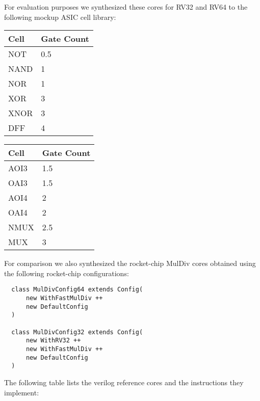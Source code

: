 For evaluation purposes we synthesized these cores for RV32 and RV64 to the following mockup ASIC cell library:

\begin{center}
\begin{tabular}{ll}
Cell & Gate Count \\
\hline
NOT   & 0.5 \\
NAND  & 1   \\
NOR   & 1   \\
XOR   & 3   \\
XNOR  & 3   \\
DFF   & 4   \\
\end{tabular}
\hfil
\begin{tabular}{ll}
Cell & Gate Count \\
\hline
AOI3  & 1.5 \\
OAI3  & 1.5 \\
AOI4  & 2   \\
OAI4  & 2   \\
NMUX  & 2.5 \\
MUX   & 3 \\
\end{tabular}
\end{center}

For comparison we also synthesized the rocket-chip MulDiv cores obtained using the following
rocket-chip configurations:

\begin{verbatim}
  class MulDivConfig64 extends Config(
      new WithFastMulDiv ++
      new DefaultConfig
  )

  class MulDivConfig32 extends Config(
      new WithRV32 ++
      new WithFastMulDiv ++
      new DefaultConfig
  )
\end{verbatim}

The following table lists the verilog reference cores and the instructions they implement:

